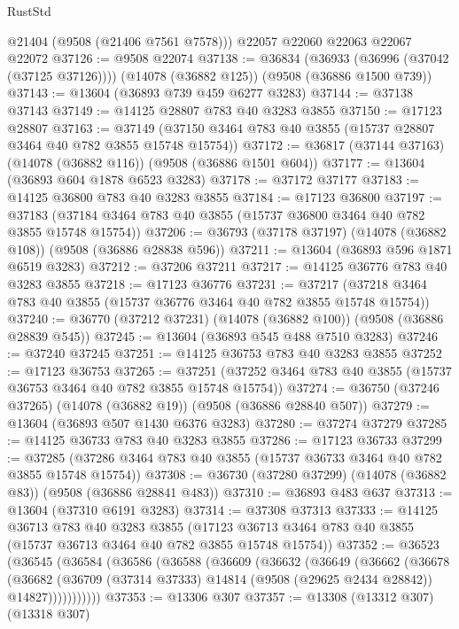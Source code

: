 \begin{lexlean}{RustStd}
\begin{coremodule}
      @21404
      (@9508 (@21406 @7561 @7578)))
    @22057
    @22060
    @22063
    @22067
    @22072
@37126 := @9508 @22074
@37138 := @36834
    (@36933 (@36996 (@37042 (@37125 @37126))))
    (@14078 (@36882 @125))
    (@9508 (@36886 @1500 @739))
@37143 := @13604 (@36893 @739 @459 @6277 @3283)
@37144 := @37138 @37143
@37149 := @14125 @28807 @783 @40 @3283 @3855
@37150 := @17123 @28807
@37163 := @37149 (@37150 @3464 @783 @40 @3855 (@15737 @28807 @3464 @40 @782 @3855 @15748 @15754))
@37172 := @36817 (@37144 @37163) (@14078 (@36882 @116)) (@9508 (@36886 @1501 @604))
@37177 := @13604 (@36893 @604 @1878 @6523 @3283)
@37178 := @37172 @37177
@37183 := @14125 @36800 @783 @40 @3283 @3855
@37184 := @17123 @36800
@37197 := @37183 (@37184 @3464 @783 @40 @3855 (@15737 @36800 @3464 @40 @782 @3855 @15748 @15754))
@37206 := @36793 (@37178 @37197) (@14078 (@36882 @108)) (@9508 (@36886 @28838 @596))
@37211 := @13604 (@36893 @596 @1871 @6519 @3283)
@37212 := @37206 @37211
@37217 := @14125 @36776 @783 @40 @3283 @3855
@37218 := @17123 @36776
@37231 := @37217 (@37218 @3464 @783 @40 @3855 (@15737 @36776 @3464 @40 @782 @3855 @15748 @15754))
@37240 := @36770 (@37212 @37231) (@14078 (@36882 @100)) (@9508 (@36886 @28839 @545))
@37245 := @13604 (@36893 @545 @488 @7510 @3283)
@37246 := @37240 @37245
@37251 := @14125 @36753 @783 @40 @3283 @3855
@37252 := @17123 @36753
@37265 := @37251 (@37252 @3464 @783 @40 @3855 (@15737 @36753 @3464 @40 @782 @3855 @15748 @15754))
@37274 := @36750 (@37246 @37265) (@14078 (@36882 @19)) (@9508 (@36886 @28840 @507))
@37279 := @13604 (@36893 @507 @1430 @6376 @3283)
@37280 := @37274 @37279
@37285 := @14125 @36733 @783 @40 @3283 @3855
@37286 := @17123 @36733
@37299 := @37285 (@37286 @3464 @783 @40 @3855 (@15737 @36733 @3464 @40 @782 @3855 @15748 @15754))
@37308 := @36730 (@37280 @37299) (@14078 (@36882 @83)) (@9508 (@36886 @28841 @483))
@37310 := @36893 @483 @637
@37313 := @13604 (@37310 @6191 @3283)
@37314 := @37308 @37313
@37333 := @14125
    @36713
    @783
    @40
    @3283
    @3855
    (@17123 @36713 @3464 @783 @40 @3855 (@15737 @36713 @3464 @40 @782 @3855 @15748 @15754))
@37352 := @36523
    (@36545
      (@36584
        (@36586
          (@36588
            (@36609
              (@36632
                (@36649
                  (@36662
                    (@36678
                      (@36682
                        (@36709
                          (@37314 @37333)
                          @14814
                          (@9508 (@29625 @2434 @28842))
                          @14827)))))))))))
@37353 := @13306 @307
@37357 := @13308 (@13312 @307) (@13318 @307)

\end{coremodule}
\end{lexlean}
